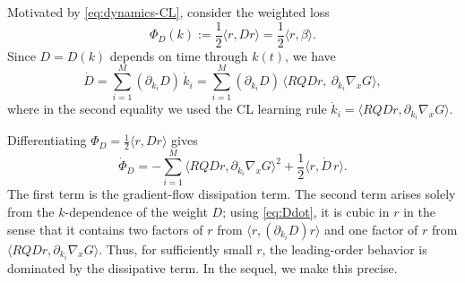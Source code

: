 \documentclass{siamart}
\begin{document}
Motivated by \eqref{eq:dynamics-CL}, consider the weighted loss
\begin{equation}
    \Phi_D(k):=\frac12\langle r, Dr\rangle =\frac12\langle r, \beta \rangle.
\end{equation}
Since $D=D(k)$ depends on time through $k(t)$, we have
\begin{equation}
\dot D
= \sum_{i=1}^M (\partial_{k_i}D)\,\dot k_i
= \sum_{i=1}^M (\partial_{k_i}D)\,\big\langle R Q Dr,~\partial_{k_i}\nabla_x G\big\rangle,
\label{eq:Ddot}
\end{equation}
where in the second equality we used the CL learning rule
$\dot k_i=\langle RQDr,\partial_{k_i}\nabla_xG\rangle$.

Differentiating $\Phi_D=\frac12 \langle r, D r\rangle$ gives
\begin{equation}
\dot{\Phi}_D
= - \sum_{i=1}^M\big\langle R Q Dr,\partial_{k_i}\nabla_x G\big\rangle^2
+\frac12\big\langle r,\dot D\,r\big\rangle.
\label{eq:PhiD_dot}
\end{equation}
The first term is the gradient-flow dissipation term. The second term arises solely from the $k$-dependence of the weight $D$; using \eqref{eq:Ddot}, it is cubic in $r$ in the sense that it contains two factors of $r$ from $\langle r,(\partial_{k_i}D)r\rangle$ and one factor of $r$ from $\langle RQDr,\partial_{k_i}\nabla_xG\rangle$. Thus, for sufficiently small $r$, the leading-order behavior is dominated by the dissipative term. In the sequel, we make this precise.
\end{document}
